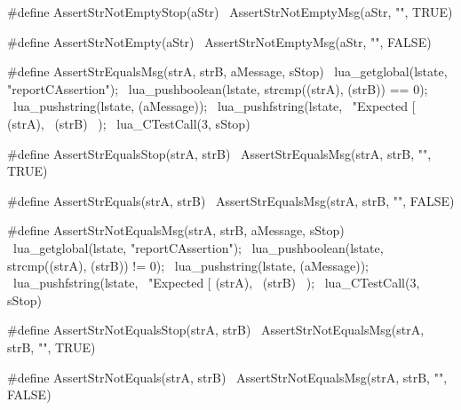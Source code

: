 #define AssertStrNotEmptyStop(aStr)    \
  AssertStrNotEmptyMsg(aStr, "", TRUE)
  
#define AssertStrNotEmpty(aStr)         \
  AssertStrNotEmptyMsg(aStr, "", FALSE)
\stopCHeader

\stopTestSuite

\startTestSuite[assertStrEquals]

\startCHeader
#define AssertStrEqualsMsg(strA, strB, aMessage, sStop) \
  lua_getglobal(lstate, "reportCAssertion");            \
  lua_pushboolean(lstate, strcmp((strA), (strB)) == 0); \
  lua_pushstring(lstate, (aMessage));                   \
  lua_pushfstring(lstate,                               \
      "Expected [%
      (strA),                                           \
      (strB)                                            \
    );                                                  \
  lua_CTestCall(3, sStop)

#define AssertStrEqualsStop(strA, strB)    \
  AssertStrEqualsMsg(strA, strB, "", TRUE)
  
#define AssertStrEquals(strA, strB)         \
  AssertStrEqualsMsg(strA, strB, "", FALSE)
\stopCHeader

\stopTestSuite

\startTestSuite[assertStrNotEquals]

\startCHeader
#define AssertStrNotEqualsMsg(strA, strB, aMessage, sStop) \
  lua_getglobal(lstate, "reportCAssertion");               \
  lua_pushboolean(lstate, strcmp((strA), (strB)) != 0);    \
  lua_pushstring(lstate, (aMessage));                      \
  lua_pushfstring(lstate,                                  \
      "Expected [%
      (strA),                                              \
      (strB)                                               \
    );                                                     \
  lua_CTestCall(3, sStop)

#define AssertStrNotEqualsStop(strA, strB)    \
  AssertStrNotEqualsMsg(strA, strB, "", TRUE)
  
#define AssertStrNotEquals(strA, strB)         \
  AssertStrNotEqualsMsg(strA, strB, "", FALSE)
\stopCHeader

\stopTestSuite

\startTestSuite[assertStrMatches]

